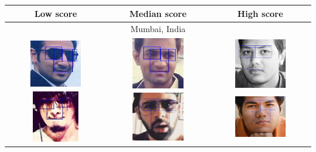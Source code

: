 \newcommand\Tstrut{\rule{0pt}{2.6ex}}       %
\newcommand\Bstrut{\rule[-0.9ex]{0pt}{0pt}} %
\newcommand{\TBstrut}{\Tstrut\Bstrut} %
\begin{table}[ht!]
    \begin{center}
        \begin{tabular}{c|c|c}
            \toprule
            Low score & Median score & High score \\


\midrule \multicolumn{3}{c}{Mumbai, India} \TBstrut \\ \midrule 
\includegraphics[height=2.2cm,width=2.2cm]{figures/results/detections/india/male/lq/18a4c991-2a46-486f-9d45-c7e9f12bd291.jpeg}
\includegraphics[height=2.2cm,width=2.2cm]{figures/results/detections/india/male/lq/75672244-f5d1-4e4f-8550-87dba909361c.jpeg}
&
\includegraphics[height=2.2cm,width=2.2cm]{figures/results/detections/india/male/mq/9ad2817e-1483-43c7-96cc-677aa1e9f6c6.jpeg}
\includegraphics[height=2.2cm,width=2.2cm]{figures/results/detections/india/male/mq/36aa377f-4ada-48b2-9848-82574f3636e0.jpeg}
&
\includegraphics[height=2.2cm,width=2.2cm]{figures/results/detections/india/male/hq/4f32013d-1da1-46bd-8ca8-b0e3ce13b1ce.jpeg}
\includegraphics[height=2.2cm,width=2.2cm]{figures/results/detections/india/male/hq/6177e04d-50d1-48df-8ffa-c51c154e7db4.jpeg}
\TBstrut \\ 



\end{tabular}
\end{center}
\end{table}

